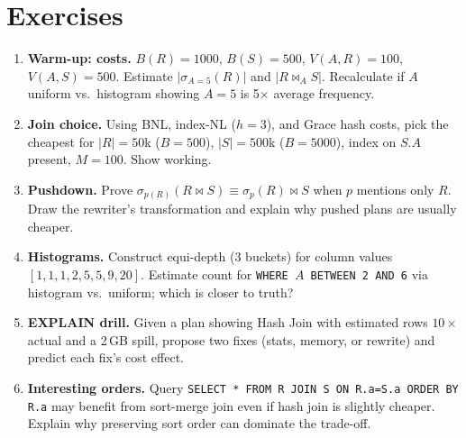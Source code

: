 \section{Exercises}
\label{sec:ch06-ex}
\begin{enumerate}[label=E6.\arabic*, leftmargin=*, itemsep=0.75em]
    \item \textbf{Warm-up: costs.} $B(R)=1000$, $B(S)=500$, $V(A,R)=100$, $V(A,S)=500$. Estimate $|\sigma_{A=5}(R)|$ and $|R\bowtie_A S|$. Recalculate if $A$ uniform vs.\ histogram showing $A=5$ is 5$\times$ average frequency.
    \item \textbf{Join choice.} Using BNL, index-NL ($h=3$), and Grace hash costs, pick the cheapest for $|R|=50$k ($B=500$), $|S|=500$k ($B=5000$), index on $S.A$ present, $M=100$. Show working.
    \item \textbf{Pushdown.} Prove $\sigma_{p(R)} (R\bowtie S)\equiv \sigma_{p}(R)\bowtie S$ when $p$ mentions only $R$. Draw the rewriter's transformation and explain why pushed plans are usually cheaper.
    \item \textbf{Histograms.} Construct equi-depth (3 buckets) for column values $[1,1,1,2,5,5,9,20]$. Estimate count for \texttt{WHERE $A$ BETWEEN 2 AND 6} via histogram vs.\ uniform; which is closer to truth?
    \item \textbf{EXPLAIN drill.} Given a plan showing Hash Join with estimated rows $10\times$ actual and a 2\,GB spill, propose two fixes (stats, memory, or rewrite) and predict each fix's cost effect.
    \item \textbf{Interesting orders.} Query \texttt{SELECT * FROM R JOIN S ON R.a=S.a ORDER BY R.a} may benefit from sort-merge join even if hash join is slightly cheaper. Explain why preserving sort order can dominate the trade-off.
\end{enumerate}
\relax %
\relax %
